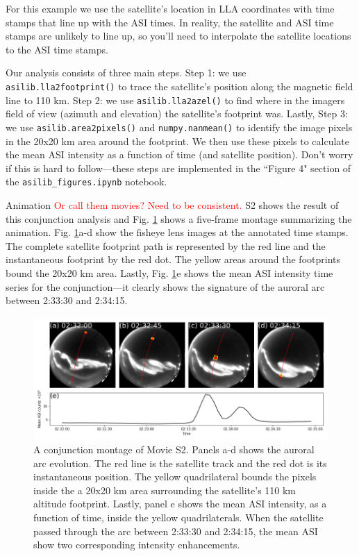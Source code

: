 \documentclass[draft]{agujournal2019}
\begin{document}
For this example we use the satellite's location in LLA coordinates with time stamps that line up with the ASI times. In reality, the satellite and ASI time stamps are unlikely to line up, so you'll need to interpolate the satellite locations to the ASI time stamps.

Our analysis consists of three main steps. Step 1: we use \verb|asilib.lla2footprint()| to trace the satellite's position along the magnetic field line to 110 km. Step 2: we use \verb|asilib.lla2azel()| to find where in the imagers field of view (azimuth and elevation) the satellite's footprint was. Lastly, Step 3: we use \verb|asilib.area2pixels()| and \verb|numpy.nanmean()| to identify the image pixels in the 20x20 km area around the footprint. We then use these pixels to calculate the mean ASI intensity as a function of time (and satellite position). Don't worry if this is hard to follow---these steps are implemented in the ``Figure 4" section of the \verb|asilib_figures.ipynb| notebook.

Animation \textcolor{red}{Or call them movies? Need to be consistent.} S2 shows the result of this conjunction analysis and Fig. \ref{fig4} shows a five-frame montage summarizing the animation. Fig. \ref{fig4}a-d show the fisheye lens images at the annotated time stamps. The complete satellite footprint path is represented by the red line and the instantaneous footprint by the red dot. The yellow areas around the footprints bound the 20x20 km area. Lastly, Fig. \ref{fig4}e shows the mean ASI intensity time series for the conjunction---it clearly shows the signature of the auroral arc between 2:33:30 and 2:34:15.

\begin{figure}
      \includegraphics[width=\textwidth]{figures/fig4.png}
      \caption{A conjunction montage of Movie S2. Panels a-d shows the auroral arc evolution. The red line is the satellite track and the red dot is its instantaneous position. The yellow quadrilateral bounds the pixels inside the a 20x20 km area surrounding the satellite's 110 km altitude footprint. Lastly, panel e shows the mean ASI intensity, as a function of time, inside the yellow quadrilaterals. When the satellite passed through the arc between 2:33:30 and 2:34:15, the mean ASI show two corresponding intensity enhancements.}
      \label{fig4}
\end{figure}
\end{document}
